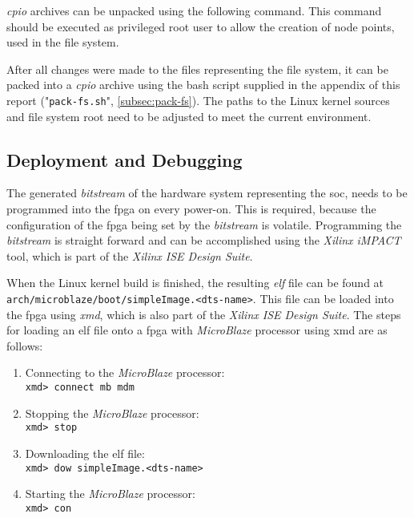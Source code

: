 \textit{cpio} archives can be unpacked using the following command. This command should be executed as privileged root user to allow the creation of node points, used in the file system.

After all changes were made to the files representing the file system, it can be packed into a \textit{cpio} archive using the bash script supplied in the appendix of this report ("\texttt{pack-fs.sh}", \ref{subsec:pack-fs}). The paths to the Linux kernel sources and file system root need to be adjusted to meet the current environment.

\subsection{Deployment and Debugging}

The generated \textit{bitstream} of the hardware system representing the \gls{soc}, needs to be programmed into the \gls{fpga} on every power-on. This is required, because the configuration of the \gls{fpga} being set by the \textit{bitstream} is volatile. Programming the \textit{bitstream} is straight forward and can be accomplished using the \textit{Xilinx iMPACT} tool, which is part of the \textit{Xilinx ISE Design Suite}.

When the Linux kernel build is finished, the resulting \textit{\gls{elf}} file can be found at \texttt{arch/microblaze/boot/simpleImage.<dts-name>}. This file can be loaded into the \gls{fpga} using \textit{\gls{xmd}}, which is also part of the \textit{Xilinx ISE Design Suite}. The steps for loading an \gls{elf} file onto a \gls{fpga} with \textit{MicroBlaze} processor using \gls{xmd} are as follows:

\begin{enumerate}
  \setlength{\itemsep}{1pt}
  \setlength{\parskip}{2pt}
  \setlength{\parsep}{0pt}
\item Connecting to the \textit{MicroBlaze} processor:\\ \texttt{xmd> connect mb mdm}
\item Stopping the \textit{MicroBlaze} processor:\\ \texttt{xmd> stop}
\item Downloading the \gls{elf} file:\\ \texttt{xmd> dow simpleImage.<dts-name>}
\item Starting the \textit{MicroBlaze} processor:\\ \texttt{xmd> con}
\end{enumerate}


